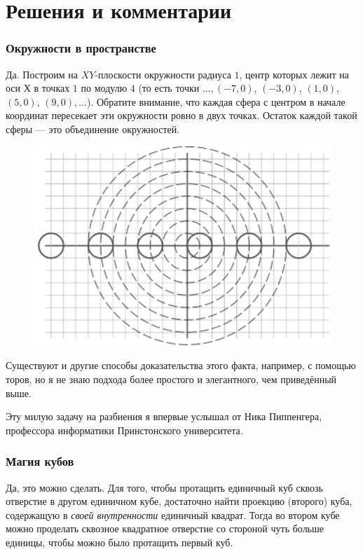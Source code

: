 \section*{Решения и комментарии}

\subsubsection*{Окружности в пространстве}%

Да.
Построим на $XY$-плоскости окружности радиуса $1$, центр которых лежит на оси $Х$ в точках $1$ по модулю $4$ (то есть точки $\dots, (-7,0)$, $(-3,0)$, $(1,0)$, $(5,0)$, $(9,0),\dots$).
Обратите внимание, что каждая сфера с центром в начале координат пересекает эти окружности ровно в двух точках.
Остаток каждой такой сферы --- это объединение окружностей.
\heart

\begin{figure}[h!]
\centering
\includegraphics[scale=0.7]{Figs/Geometry/ring}
\end{figure} 

Существуют и другие способы доказательства этого факта, например, с помощью торов, но я не знаю подхода более простого и элегантного, чем приведённый выше.

Эту милую задачу на разбиения я впервые услышал от Ника Пиппенгера, %
профессора информатики Принстонского университета.

\subsubsection*{Магия кубов}%

Да, это можно сделать.
Для того, чтобы протащить единичный куб сквозь отверстие в другом единичном кубе, достаточно найти проекцию (второго) куба, содержащую в \emph{своей внутренности} единичный квадрат.
Тогда во втором кубе можно проделать сквозное квадратное отверстие %
со стороной чуть больше единицы, чтобы можно было протащить первый куб.

